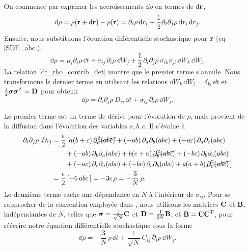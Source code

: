 \documentclass[openany,a4paper,12pt]{article}
\begin{document}
\par On commence par exprimer les accroissements $\dd \rho$ en termes de $\dd \bold r$,
%
\begin{equation}\label{averaging_drho_1}
	\dd\rho = \rho(\bold r+ \dd \bold r) - \rho (\bold r) = \partial_i\rho \, \dd r_i + \frac 12 \partial_i \partial_j \rho \, \dd r_i \, \dd r_j.
\end{equation}
% 
Ensuite, nous substituons l'équation différentielle stochastique pour $\bold r$ (eq \ref{SDE_abc}),
%
\begin{equation}\label{averaging_drho_2}
	\dd \rho = \mu_i\partial_i\rho \, \dd t + \sigma_{ij} \, \partial_i\rho \, \dd W_j + \frac 12 \, \partial_i \partial_j \rho \  \sigma_{ik}\sigma_{jl} \, \dd W_k \, \dd W_l.
\end{equation}
%
La relation \ref{dt_rho_contrib_det} montre que le premier terme s'annule. Nous transformons le dernier terme en utilisant les relations $\dd W_k \, \dd W_l = \delta_{kl} \, \dd t$ et $\frac 12 \boldsymbol \sigma \boldsymbol \sigma^T = \bold D$ pour obtenir
%
\begin{equation}\label{averaging_drho_3}
	\dd \rho = \partial_i \partial_j \rho \ D_{ij} \, \dd t + \sigma_{ij} \, \partial_i\rho \, \dd W_j.
\end{equation}
%
\par Le premier terme est un terme de dérive pour l'évolution de $\rho$, mais provient de la diffusion dans l'évolution des variables $a,b,c$. Il s'évalue à
%
\begin{equation}\label{drho_derive_stoch}
\begin{split}
	\partial_i \partial_j \rho \ D_{ij}
	&= \frac \epsilon 2 \, [ a(b+c) \, \cancel{ \partial_a^2(abc)} + (-ab) \, \partial_a \partial_b(abc) + (-ac) \, \partial_a\partial_c(abc) \\
	&\qquad + (-ab) \, \partial_b \partial_a (abc) + b(c+a) \, \cancel{ \partial_b^2(abc)} + (-bc) \, \partial_b\partial_c(abc) \\
	&\qquad + (-ac) \, \partial_c\partial_a(abc) + (-bc) \, \partial_c\partial_b(abc) + c(a+b) \, \cancel{ \partial_c^2(abc)} \,] \\
	&= \frac \epsilon 2 \, [-6 \, abc \,] = -3\epsilon \, \rho = -\frac 3N \, \rho.
\end{split}
\end{equation}
%
Le deuxième terme cache une dépendance en $N$ à l'intérieur de $\sigma_{ij}$. Pour se rapprocher de la convention employée dans \cite{frey2012}, nous utilisons les matrices $\bold C$ et $\bold B$, indépendantes de $N$, telles que $\boldsymbol \sigma = \frac{1}{\sqrt{N}} \bold C$ et $\bold D = \frac{1}{2N} \bold B$, et $\bold B = \bold C \bold C^T$, pour réécrire notre équation différentielle stochastique sous la forme
%
\begin{equation}\label{averaging_drho_4}
	\dd \rho = -\frac 3N \, \rho \, \dd t + \frac{1}{\sqrt{N}}\, C_{ij} \, \partial_i\rho \, \dd W_j.
\end{equation}
%
\end{document}

